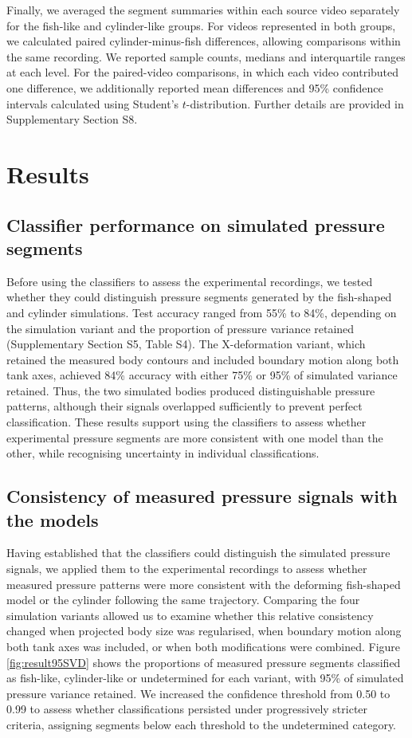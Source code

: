 \documentclass[openacc]{rsproca_new}
\begin{document}
Finally, we averaged the segment summaries within each source video separately for the fish-like and cylinder-like groups. For videos represented in both groups, we calculated paired cylinder-minus-fish differences, allowing comparisons within the same recording. We reported sample counts, medians and interquartile ranges at each level. For the paired-video comparisons, in which each video contributed one difference, we additionally reported mean differences and 95\% confidence intervals calculated using Student's $t$-distribution. Further details are provided in Supplementary Section S8.

\section{Results}
\label{sec:results}

\subsection{Classifier performance on simulated pressure segments}
Before using the classifiers to assess the experimental recordings, we tested whether they could distinguish pressure segments generated by the fish-shaped and cylinder simulations. Test accuracy ranged from 55\% to 84\%, depending on the simulation variant and the proportion of pressure variance retained (Supplementary Section S5, Table S4). The X-deformation variant, which retained the measured body contours and included boundary motion along both tank axes, achieved 84\% accuracy with either 75\% or 95\% of simulated variance retained. Thus, the two simulated bodies produced distinguishable pressure patterns, although their signals overlapped sufficiently to prevent perfect classification. These results support using the classifiers to assess whether experimental pressure segments are more consistent with one model than the other, while recognising uncertainty in individual classifications.

\subsection{Consistency of measured pressure signals with the models}
Having established that the classifiers could distinguish the simulated pressure signals, we applied them to the experimental recordings to assess whether measured pressure patterns were more consistent with the deforming fish-shaped model or the cylinder following the same trajectory. Comparing the four simulation variants allowed us to examine whether this relative consistency changed when projected body size was regularised, when boundary motion along both tank axes was included, or when both modifications were combined. Figure \ref{fig:result95SVD} shows the proportions of measured pressure segments classified as fish-like, cylinder-like or undetermined for each variant, with 95\% of simulated pressure variance retained. We increased the confidence threshold from 0.50 to 0.99 to assess whether classifications persisted under progressively stricter criteria, assigning segments below each threshold to the undetermined category.
\end{document}

